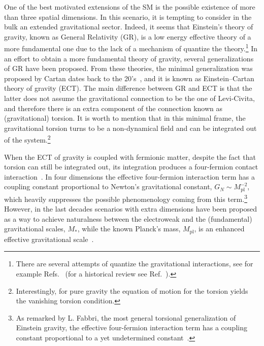 \documentclass{ws-mpla}
\renewcommand{\(}{\left(}
\renewcommand{\)}{\right)}
\renewcommand{\[}{\left[}
\renewcommand{\]}{\right]}
\begin{document}
One of the best motivated extensions of the SM is the possible existence of more than three spatial dimensions. In this scenario, it is tempting to consider in the bulk an extended gravitational sector. Indeed, it seems that Einstein's theory of gravity, known as General Relativity (GR), is a low energy effective theory of a more fundamental one due to the lack of a mechanism of quantize the theory.\footnote{There are several attempts of quantize the gravitational interactions, see for example Refs.~ (for a historical review see Ref.~).} In an effort to obtain a more fundamental theory of gravity, several generalizations of GR have been proposed. From these theories, the minimal generalization was proposed by Cartan dates back to the 20's~\cite{Cartan-Einstein,Cartan1922,Cartan1923,Cartan1924,Cartan1925}, and it is known as Einstein--Cartan theory of gravity (ECT). The main difference between GR and ECT is that the latter does not assume the gravitational connection to be the one of Levi-Civita, and therefore there is an extra component of the connection known as (gravitational) torsion. It is worth to mention that in this minimal frame, the gravitational torsion turns to be a non-dynamical field and can be integrated out of the system.\footnote{Interestingly, for pure gravity the equation of motion for the torsion yields the vanishing torsion condition.}

When the ECT of gravity is coupled with fermionic matter, despite the fact that torsion can still be integrated out, its integration produces a four-fermion contact interaction~\cite{Kibble:1961ba,RevModPhys.48.393,Shapiro:2001rz,SUGRA-book,Castillo-Felisola:2013jva}. In four dimensions the effective four-fermion interaction term has a coupling constant proportional to Newton's gravitational constant, $G_N\sim M_{\text{pl}}^{-2}$, which heavily suppresses the possible phenomenology coming from this term.\footnote{As remarked by L. Fabbri, the most general torsional generalization of Einstein gravity, the effective four-fermion interaction term has a coupling constant proportional to a yet undetermined constant~\cite{Fabbri:2011kq}.} However, in the last decades scenarios with extra dimensions have been proposed as a way to achieve naturalness between the electroweak and the (fundamental) gravitational scales, $M_*$, while the known Planck's mass, $M_{\text{pl}}$, is an enhanced effective gravitational scale~\cite{ADD1,AADD,ADD2,RS1,RS2}.
\end{document}
